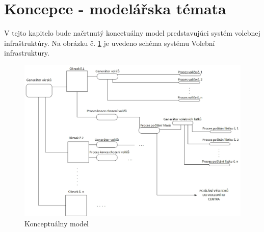 \documentclass[12pt,a4paper,titlepage,final]{article}
\begin{document}
\section{Koncepce - modelářska témata}
V tejto kapitelo bude načrtnutý koncetuálny model predstavujúci systém volebnej infraštruktúry.
Na obrázku č. \ref{koncept} je uvedeno schéma systému Volební infrastruktury. 
\begin{figure}[h]

\begin{center}

\includegraphics[scale=0.7]{img/konceptualni_model.eps} 
\caption{Konceptuálny model}
\label{koncept}

\end{center}

\end{figure}
\newpage
\end{document}
